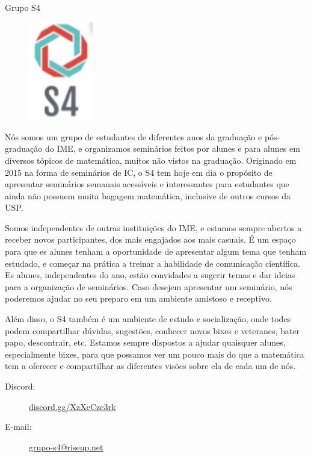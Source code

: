 \begin{subsecao}{Grupo S4}

\begin{figure}
    \vspace{-25pt}
    \begin{center}
      \includegraphics[width=0.25\textwidth]{img/logo S4 maior.png}
    \end{center}
    \vspace{-25pt}
  \end{figure}


Nós somos um grupo de estudantes de diferentes anos da graduação e pós-graduação 
do IME, e organizamos seminários feitos por alunes e para alunes em diversos
tópicos de matemática, muitos não vistos na graduação. Originado em 2015 na forma
de seminários de IC, o S4 tem hoje em dia o propósito de apresentar seminários 
semanais acessíveis e interessantes para estudantes que ainda não possuem muita 
bagagem matemática, inclusive de outros cursos da USP. 

Somos independentes de outras instituições do IME, e estamos sempre abertos a 
receber novos participantes, dos mais engajados aos mais casuais. É um espaço
para que es alunes tenham a oportunidade de apresentar algum tema que tenham
estudado, e começar na prática a treinar a habilidade de comunicação científica. 
Es alunes, independentes do ano, estão convidades a sugerir temas e dar ideias
para a organização de seminários. Caso desejem apresentar um seminário, nós
poderemos ajudar no seu preparo em um ambiente amistoso e receptivo.

Além disso, o S4 também é um ambiente de estudo e socialização, onde todes podem
compartilhar dúvidas, sugestões, conhecer novos bixes e veteranes, bater papo,
descontrair, etc. Estamos sempre dispostos a ajudar quaisquer alunes, especialmente
bixes, para que possamos ver um pouco mais do que a matemática tem a oferecer e
compartilhar as diferentes visões sobre ela de cada um de nós.

\begin{description}
  \item[Discord:] \url{discord.gg/XzXeCzc3rk}
  \item[E-mail:] \url{grupo-s4@riseup.net}
\end{description}

\end{subsecao}
